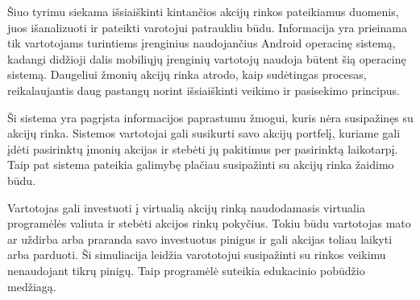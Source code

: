 Šiuo tyrimu siekama išsiaiškinti kintančios akcijų rinkos pateikiamus duomenis, juos išanalizuoti ir pateikti varotojui patraukliu būdu. Informacija yra prieinama tik vartotojams turintiems įrenginius naudojančius Android operacinę sistemą, kadangi didžioji dalis mobiliųjų įrenginių vartotojų naudoja būtent šią operacinę sistemą. Daugeliui žmonių akcijų rinka atrodo, kaip sudėtingas procesas, reikalaujantis daug pastangų norint išsiaiškinti veikimo ir pasisekimo principus. 

Ši sistema yra pagrįsta informacijos paprastumu žmogui, kuris nėra susipažinęs su akcijų rinka. Sistemos vartotojai gali susikurti savo akcijų portfelį, kuriame gali įdėti pasirinktų įmonių akcijas ir stebėti jų pakitimus per pasirinktą laikotarpį. Taip pat sistema pateikia galimybę plačiau susipažinti su akcijų rinka žaidimo būdu. 

Vartotojas gali investuoti į virtualią akcijų rinką naudodamasis virtualia programėlės valiuta ir stebėti akcijos rinkų pokyčius. Tokiu būdu vartotojas mato ar uždirba arba praranda savo investuotus pinigus ir gali akcijas toliau laikyti arba parduoti. Ši simuliacija leidžia varototojui susipažinti su rinkos veikimu nenaudojant tikrų pinigų. Taip programėlė suteikia edukacinio pobūdžio medžiagą.